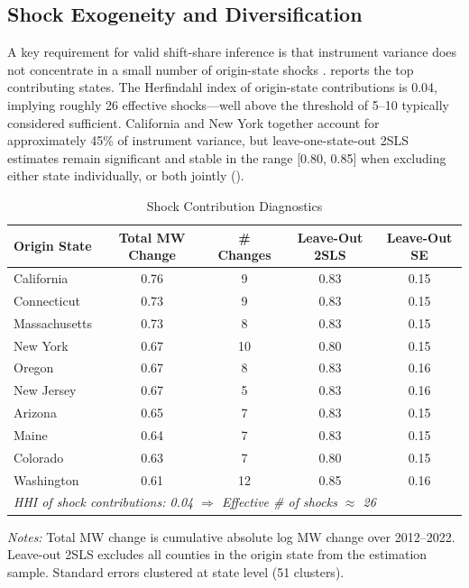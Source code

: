 \documentclass[12pt]{article}
\begin{document}
\subsection{Shock Exogeneity and Diversification}

A key requirement for valid shift-share inference is that instrument variance does not concentrate in a small number of origin-state shocks \citep{borusyak2022quasi}.  reports the top contributing states. The Herfindahl index of origin-state contributions is 0.04, implying roughly 26 effective shocks---well above the threshold of 5--10 typically considered sufficient. California and New York together account for approximately 45\% of instrument variance, but leave-one-state-out 2SLS estimates remain significant and stable in the range [0.80, 0.85] when excluding either state individually, or both jointly ().

\begin{table}[t]
\centering
\caption{Shock Contribution Diagnostics}
\label{tab:shock_contrib}
\begin{threeparttable}
\begin{tabular}{lcccc}
\toprule
Origin State & Total MW Change & \# Changes & Leave-Out 2SLS & Leave-Out SE \\
\midrule
California & 0.76 & 9 & 0.83 & 0.15 \\
Connecticut & 0.73 & 9 & 0.83 & 0.15 \\
Massachusetts & 0.73 & 8 & 0.83 & 0.15 \\
New York & 0.67 & 10 & 0.80 & 0.15 \\
Oregon & 0.67 & 8 & 0.83 & 0.16 \\
New Jersey & 0.67 & 5 & 0.83 & 0.16 \\
Arizona & 0.65 & 7 & 0.83 & 0.15 \\
Maine & 0.64 & 7 & 0.83 & 0.15 \\
Colorado & 0.63 & 7 & 0.80 & 0.15 \\
Washington & 0.61 & 12 & 0.85 & 0.16 \\
\midrule
\multicolumn{5}{l}{\textit{HHI of shock contributions: 0.04 $\Rightarrow$ Effective \# of shocks $\approx$ 26}} \\
\bottomrule
\end{tabular}
\begin{tablenotes}[flushleft]
\small
\item \textit{Notes:} Total MW change is cumulative absolute log MW change over 2012--2022. Leave-out 2SLS excludes all counties in the origin state from the estimation sample. Standard errors clustered at state level (51 clusters).
\end{tablenotes}
\end{threeparttable}
\end{table}
\end{document}

